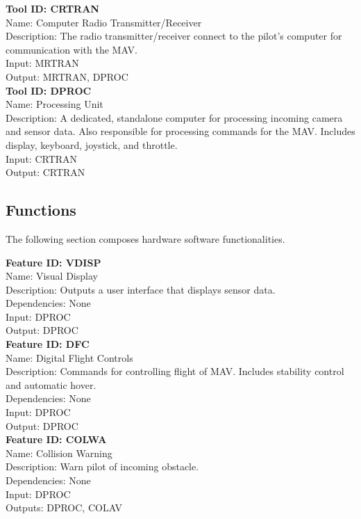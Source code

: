\documentclass[onecolumn, oneside, letterpaper, draftclsnofoot, 10pt, compsoc]{IEEEtran}
\begin{document}
\noindent
\textbf{Tool ID: CRTRAN}\\
Name: Computer Radio Transmitter/Receiver\\
Description: The radio transmitter/receiver connect to the pilot’s computer for communication with the MAV.\\
Input: MRTRAN\\
Output: MRTRAN, DPROC\\

\noindent
\textbf{Tool ID: DPROC}\\
Name: Processing Unit\\
Description: A dedicated, standalone computer for processing incoming camera and sensor data. Also responsible for processing commands for the MAV. Includes display, keyboard, joystick, and throttle.\\
Input: CRTRAN\\
Output: CRTRAN\\


\subsection{Functions}
The following section composes hardware software functionalities.

\noindent
\textbf{Feature ID: VDISP}\\
Name: Visual Display\\
Description: Outputs a user interface that displays sensor data.\\
Dependencies: None\\
Input: DPROC\\
Output: DPROC\\

\noindent
\textbf{Feature ID: DFC}\\
Name: Digital Flight Controls\\
Description: Commands for controlling flight of MAV. Includes stability control and automatic hover.\\
Dependencies: None\\
Input: DPROC\\
Output: DPROC\\

\noindent
\textbf{Feature ID: COLWA}\\
Name: Collision Warning\\
Description: Warn pilot of incoming obstacle.\\
Dependencies: None\\
Input: DPROC\\
Outputs: DPROC, COLAV\\
\end{document}
